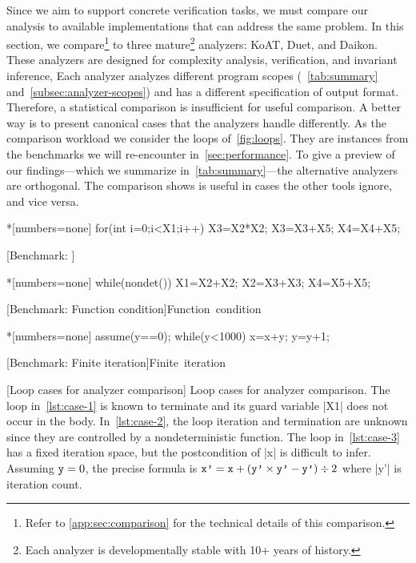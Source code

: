 Since we aim to support concrete verification tasks, we must compare our analysis to available implementations that can address the same problem.
In this section, we compare\footnote{Refer to \autoref{app:sec:comparison} for the technical details of this comparison.}
\impl to three mature\footnote{Each analyzer is developmentally stable with 10+ years of history.} analyzers: KoAT, Duet, and Daikon.
These analyzers are designed for complexity analysis, verification, and invariant inference, \resp
Each analyzer analyzes different program scopes (\cf~\autoref{tab:summary} and~\autoref{subsec:analyzer-scopes}) and has a different specification of output format.
Therefore, a statistical comparison is insufficient for useful comparison.
A better way is to present canonical cases that the analyzers handle differently.
As the comparison workload we consider the loops of~\autoref{fig:loops}.
They are instances from the benchmarks we will re-encounter in~\autoref{sec:performance}.
To give a preview of our findings---which we summarize in~\autoref{tab:summary}---the alternative analyzers are {orthogonal}.
The comparison shows \impl is useful in cases the other tools ignore, and vice versa.

\begin{center}
\captionsetup{type=figure}
\begin{minipage}{\textwidth}
\begin{minipage}[t]{.33\textwidth}
\begin{implisting}*[numbers=none]
for(int i=0;i<X1;i++)
{ X3=X2*X2;
  X3=X3+X5;
  X4=X4+X5; }
\end{implisting}
[Benchmark: \explain]{\mbox{\explain}}
\label{lst:case-1}
\end{minipage}\hfill%
\begin{minipage}[t]{.33\textwidth}
\begin{implisting}*[numbers=none]
while(nondet())
{ X1=X2+X2;
  X2=X3+X3;
  X4=X5+X5; }
\end{implisting}
[Benchmark: Function condition]{\mbox{Function condition}}
\label{lst:case-2}
\end{minipage}\hfill%
\begin{minipage}[t]{.3\textwidth}
\begin{implisting}*[numbers=none]
assume(y==0);
while(y<1000)
{ x=x+y;
  y=y+1; }
\end{implisting}
[Benchmark: Finite iteration]{\mbox{Finite iteration}}
\label{lst:case-3}
\end{minipage}
\end{minipage}
[Loop cases for analyzer comparison]{
Loop cases for analyzer comparison.
The loop in~\ref{lst:case-1} is known to terminate and its guard variable \pr|X1| does not occur in the body.
In~\ref{lst:case-2}, the loop iteration and termination are unknown since they are controlled by a nondeterministic function.
The loop in~\ref{lst:case-3} has a fixed iteration space, but the postcondition of \pr|x| is difficult to infer.
Assuming \(\prm{y}=0\), the precise formula is \(\prm{x'} = \prm{x} + (\prm{y'} \times \prm{y'} - \prm{y'}) \div 2\) where \pr|y'| is iteration count.}
\label{fig:loops}
\end{center}

